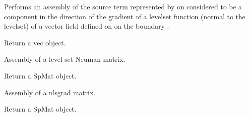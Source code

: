 \documentclass[a4paper,11pt,english]{sphinxmanual}
\begin{document}

\begin{fulllineitems}
\label{\detokenize{python/cmdref_Module asm:getfem.asm_level_set_normal_source_term}}
Performs an assembly of the source term represented by 
on  considered to be a component in the direction of the
gradient of a levelset function (normal to the levelset) of a vector
field defined on  on the boundary .

Return a vec object.

\end{fulllineitems}


\begin{fulllineitems}
\label{\detokenize{python/cmdref_Module asm:getfem.asm_lsneuman_matrix}}
Assembly of a level set Neuman  matrix.

Return a SpMat object.

\end{fulllineitems}


\begin{fulllineitems}
\label{\detokenize{python/cmdref_Module asm:getfem.asm_nlsgrad_matrix}}
Assembly of a nlsgrad matrix.

Return a SpMat object.

\end{fulllineitems}
\end{document}

